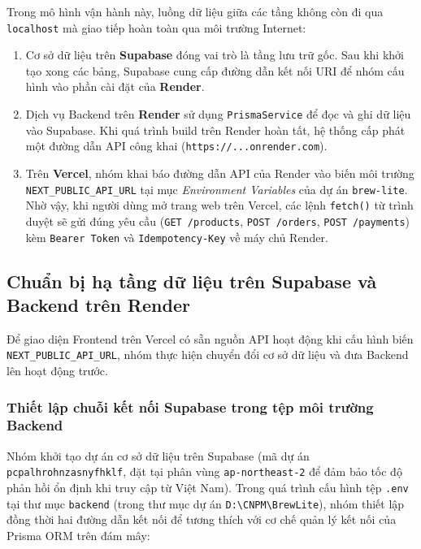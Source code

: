 Trong mô hình vận hành này, luồng dữ liệu giữa các tầng không còn đi qua \texttt{localhost} mà giao tiếp hoàn toàn qua môi trường Internet:
\begin{enumerate}
    \item Cơ sở dữ liệu trên \textbf{Supabase} đóng vai trò là tầng lưu trữ gốc. Sau khi khởi tạo xong các bảng, Supabase cung cấp đường dẫn kết nối URI để nhóm cấu hình vào phần cài đặt của \textbf{Render}.
    \item Dịch vụ Backend trên \textbf{Render} sử dụng \texttt{PrismaService} để đọc và ghi dữ liệu vào Supabase. Khi quá trình build trên Render hoàn tất, hệ thống cấp phát một đường dẫn API công khai (\texttt{https://...onrender.com}).
    \item Trên \textbf{Vercel}, nhóm khai báo đường dẫn API của Render vào biến môi trường \texttt{NEXT\_PUBLIC\_API\_URL} tại mục \textit{Environment Variables} của dự án \texttt{brew-lite}. Nhờ vậy, khi người dùng mở trang web trên Vercel, các lệnh \texttt{fetch()} từ trình duyệt sẽ gửi đúng yêu cầu (\texttt{GET /products}, \texttt{POST /orders}, \texttt{POST /payments}) kèm \texttt{Bearer Token} và \texttt{Idempotency-Key} về máy chủ Render.
\end{enumerate}

\subsection{Chuẩn bị hạ tầng dữ liệu trên Supabase và Backend trên Render}

Để giao diện Frontend trên Vercel có sẵn nguồn API hoạt động khi cấu hình biến \texttt{NEXT\_PUBLIC\_API\_URL}, nhóm thực hiện chuyển đổi cơ sở dữ liệu và đưa Backend lên hoạt động trước.

\subsubsection{Thiết lập chuỗi kết nối Supabase trong tệp môi trường Backend}
Nhóm khởi tạo dự án cơ sở dữ liệu trên Supabase (mã dự án \texttt{pcpalhrohnzasnyfhklf}, đặt tại phân vùng \texttt{ap-northeast-2} để đảm bảo tốc độ phản hồi ổn định khi truy cập từ Việt Nam). Trong quá trình cấu hình tệp \texttt{.env} tại thư mục \texttt{backend} (trong thư mục dự án \texttt{D:\textbackslash CNPM\textbackslash BrewLite}), nhóm thiết lập đồng thời hai đường dẫn kết nối để tương thích với cơ chế quản lý kết nối của Prisma ORM trên đám mây:

